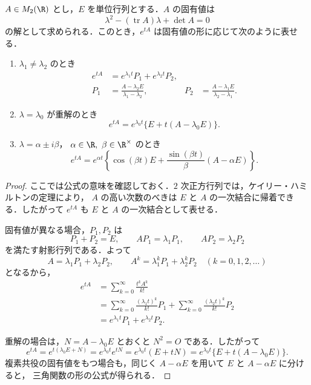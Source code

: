 \documentclass[article,paper=a4paper]{jlreq}
\begin{document}
\begin{prop}
$A\in M_2(\R)$ とし，$E$ を単位行列とする．$A$ の固有値は
\[
  \lambda^2-(\operatorname{tr} A)\lambda+\det A=0
\]
の解として求められる．このとき，$e^{tA}$ は固有値の形に応じて次のように表せる．

\begin{enumerate}[label=(\arabic*)]
  \item $\lambda_1\ne\lambda_2$ のとき
  \begin{align*}
    e^{tA}
      &= e^{\lambda_1 t}P_1+e^{\lambda_2 t}P_2,\\
    P_1
      &=\frac{A-\lambda_2 E}{\lambda_1-\lambda_2},
      &
    P_2
      &=\frac{A-\lambda_1 E}{\lambda_2-\lambda_1}.
  \end{align*}

  \item $\lambda=\lambda_0$ が重解のとき
  \[
    e^{tA}
      = e^{\lambda_0 t}\{E+t(A-\lambda_0 E)\}.
  \]

  \item $\lambda=\alpha\pm i\beta$，
  $\alpha\in\R,\ \beta\in\R^\times$ のとき
  \[
    e^{tA}
      = e^{\alpha t}
        \left\{
          \cos(\beta t)E
          +\frac{\sin(\beta t)}{\beta}(A-\alpha E)
        \right\}.
  \]
\end{enumerate}
\end{prop}

\begin{proof}
ここでは公式の意味を確認しておく．$2$ 次正方行列では，ケイリー・ハミルトンの定理により，
$A$ の高い次数のべきは $E$ と $A$ の一次結合に帰着できる．したがって $e^{tA}$ も
$E$ と $A$ の一次結合として表せる．

固有値が異なる場合，$P_1,P_2$ は
\[
  P_1+P_2=E,
  \qquad
  AP_1=\lambda_1P_1,
  \qquad
  AP_2=\lambda_2P_2
\]
を満たす射影行列である．よって
\[
  A=\lambda_1P_1+\lambda_2P_2,
  \qquad
  A^k=\lambda_1^k P_1+\lambda_2^k P_2
  \quad (k=0,1,2,\ldots)
\]
となるから，
\begin{align*}
  e^{tA}
    &=\sum_{k=0}^{\infty}\frac{t^k A^k}{k!} \\
    &=\sum_{k=0}^{\infty}\frac{(\lambda_1t)^k}{k!}P_1
      +\sum_{k=0}^{\infty}\frac{(\lambda_2t)^k}{k!}P_2 \\
    &=e^{\lambda_1t}P_1+e^{\lambda_2t}P_2.
\end{align*}

重解の場合は，$N=A-\lambda_0E$ とおくと $N^2=O$ である．したがって
\[
  e^{tA}
    =e^{t(\lambda_0E+N)}
    =e^{\lambda_0t}e^{tN}
    =e^{\lambda_0t}(E+tN)
    =e^{\lambda_0t}\{E+t(A-\lambda_0E)\}.
\]
複素共役の固有値をもつ場合も，同じく $A-\alpha E$ を用いて $E$ と $A-\alpha E$ に分けると，
三角関数の形の公式が得られる．
\end{proof}
\end{document}

